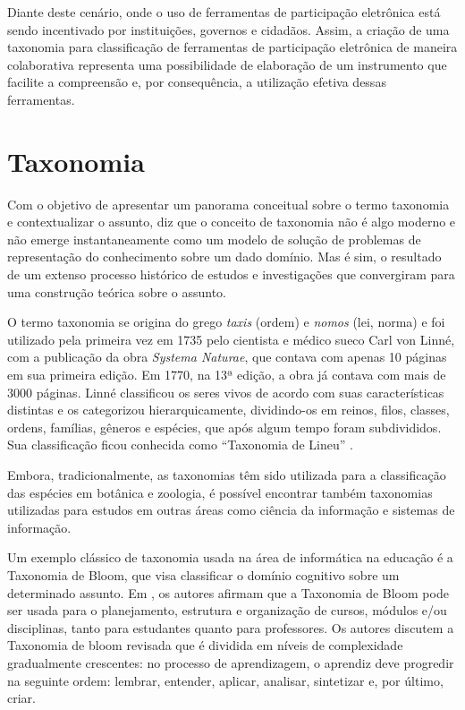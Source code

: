 \par
Diante deste cenário, onde o uso de ferramentas de participação eletrônica está sendo incentivado por instituições, governos e cidadãos. Assim, a criação de uma taxonomia para 
classificação de ferramentas de participação eletrônica de maneira colaborativa representa uma possibilidade de elaboração de um instrumento que facilite a compreensão e, 
por consequência, a utilização efetiva dessas ferramentas. 

\section{Taxonomia}
\label{sec:taxonomia}
Com o objetivo de apresentar um panorama conceitual sobre o termo taxonomia e contextualizar o assunto,  diz que o conceito de taxonomia
não é algo moderno e não emerge instantaneamente como um modelo de solução de problemas de representação do conhecimento sobre um dado domínio. Mas é sim,
o resultado de um extenso processo histórico de estudos e investigações que convergiram para uma construção teórica sobre o assunto. 

\par
O termo taxonomia se origina do grego \textit{taxis} (ordem) e \textit{nomos} (lei, norma) e foi utilizado pela primeira vez em 1735 pelo cientista e médico sueco Carl von Linné,
com a publicação da obra \textit{Systema Naturae}, que contava com apenas 10 páginas em sua primeira edição. Em 1770, na 13ª edição, a obra já contava com mais de 3000 páginas.
Linné classificou os seres vivos de acordo com suas características distintas e os categorizou hierarquicamente, dividindo-os em reinos, filos, classes, ordens, famílias, 
gêneros e espécies, que após algum tempo foram subdivididos. Sua classificação ficou conhecida como “Taxonomia de Lineu” \cite{polaszek2010systema}.

\par
Embora, tradicionalmente, as taxonomias têm sido utilizada para a classificação das espécies em botânica e zoologia, é possível encontrar também taxonomias utilizadas para estudos em outras áreas como ciência da informação e sistemas de informação.
\par
Um exemplo clássico de taxonomia usada na área de informática na educação é a Taxonomia de Bloom, que visa classificar o domínio cognitivo sobre um determinado assunto. 
Em , os autores afirmam que a Taxonomia de Bloom pode ser usada para o planejamento, estrutura e organização de cursos, módulos e/ou disciplinas, tanto para estudantes quanto para professores. Os autores discutem a Taxonomia de bloom revisada que é dividida em níveis de complexidade gradualmente crescentes: no  processo de aprendizagem, o aprendiz deve progredir na seguinte ordem: lembrar, entender, aplicar, analisar, sintetizar e, por último, criar. 
\par

